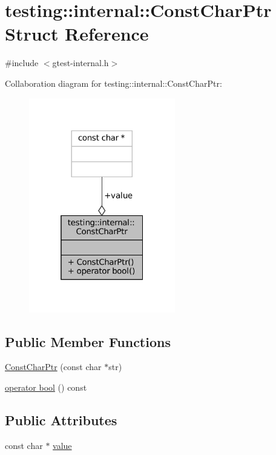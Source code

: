 \hypertarget{structtesting_1_1internal_1_1ConstCharPtr}{}\section{testing\+:\+:internal\+:\+:Const\+Char\+Ptr Struct Reference}
\label{structtesting_1_1internal_1_1ConstCharPtr}


{\ttfamily \#include $<$gtest-\/internal.\+h$>$}



Collaboration diagram for testing\+:\+:internal\+:\+:Const\+Char\+Ptr\+:
\nopagebreak
\begin{figure}[H]
\begin{center}
\leavevmode
\includegraphics[width=181pt]{structtesting_1_1internal_1_1ConstCharPtr__coll__graph}
\end{center}
\end{figure}
\subsection*{Public Member Functions}
\begin{DoxyCompactItemize}
\item 
\hyperlink{structtesting_1_1internal_1_1ConstCharPtr_ae94f6453fa679d815994eccc63062907}{Const\+Char\+Ptr} (const char $\ast$str)
\item 
\hyperlink{structtesting_1_1internal_1_1ConstCharPtr_a85c8174b5d4db8fe96863509ba767b27}{operator bool} () const
\end{DoxyCompactItemize}
\subsection*{Public Attributes}
\begin{DoxyCompactItemize}
\item 
const char $\ast$ \hyperlink{structtesting_1_1internal_1_1ConstCharPtr_adba40d23d5986904b605946f643cf26e}{value}
\end{DoxyCompactItemize}


